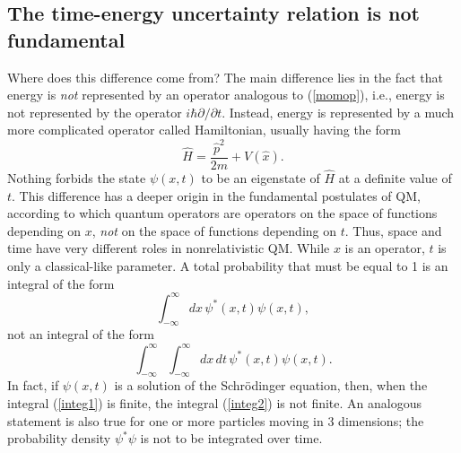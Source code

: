 \documentclass[12pt]{article}
\begin{document}
\subsection{The time-energy uncertainty relation is not fundamental}

Where does this difference come from? The main difference lies in the fact 
that energy is {\em not} represented by an 
operator analogous to (\ref{momop}), i.e., energy is not represented 
by the operator $i\hbar\partial/\partial t$. Instead, energy is represented
by a much more complicated operator called Hamiltonian, usually having 
the form
\begin{equation}
\hat{H}=\frac{\hat{p}^2}{2m}+V(\hat{x}) .
\end{equation} 
Nothing forbids the state $\psi(x,t)$ 
to be an eigenstate of $\hat{H}$ at a definite value of $t$.
This difference has a deeper origin in the fundamental postulates 
of QM, according to which quantum operators 
are operators on the space of functions depending on $x$, {\em not} on the 
space of functions depending on $t$. Thus, space and time have very different 
roles in nonrelativistic QM. While $x$ is an operator, $t$ is only 
a classical-like parameter. 
A total probability that must be equal to 1 
is an integral of the form
\begin{equation}\label{integ1}
\int_{-\infty}^{\infty} dx\, \psi^*(x,t)\psi(x,t) ,
\end{equation}
not an integral of the form
\begin{equation}\label{integ2}
\int_{-\infty}^{\infty} \int_{-\infty}^{\infty} dx\, dt\, \psi^*(x,t)\psi(x,t) .
\end{equation}
In fact, if $\psi(x,t)$ is a solution of the Schr\"odinger equation,
then, when the integral (\ref{integ1}) 
is finite, the integral (\ref{integ2}) 
is not finite. An analogous statement is also true for one or more particles 
moving in 3 dimensions; the probability density $\psi^*\psi$ is not 
to be integrated over time.
\end{document}
